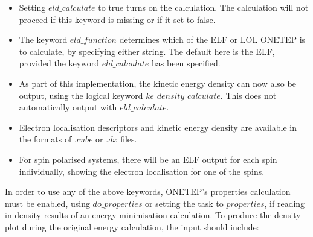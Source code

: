 \documentclass[letterpaper,10pt,english]{sphinxmanual}
\begin{document}
%
\begin{sphinxVerbatim}[commandchars=\\\{\}]
                 
            
             
     
            
              
                
\end{sphinxVerbatim}
\begin{itemize}
\item {} 
Setting \(eld\_calculate\) to true turns on the calculation. The
calculation will not proceed if this keyword is missing or if it set
to false.

\item {} 
The keyword \(eld\_function\) determines which of the ELF or LOL
ONETEP is to calculate, by specifying either string. The default here
is the ELF, provided the keyword \(eld\_calculate\) has been
specified.

\item {} 
As part of this implementation, the kinetic energy density can now
also be output, using the logical keyword
\(ke\_density\_calculate\). This does not automatically output
with \(eld\_calculate\).

\item {} 
Electron localisation descriptors and kinetic energy density are
available in the formats of \(.cube\) or \(.dx\) files.

\item {} 
For spin polarised systems, there will be an ELF output for each spin
individually, showing the electron localisation for one of the spins.

\end{itemize}

In order to use any of the above keywords, ONETEP’s properties
calculation must be enabled, using \(do\_properties\) or setting the
task to \(properties\), if reading in density results of an energy
minimisation calculation. To produce the density plot during the
original energy calculation, the input should include:
\end{document}
